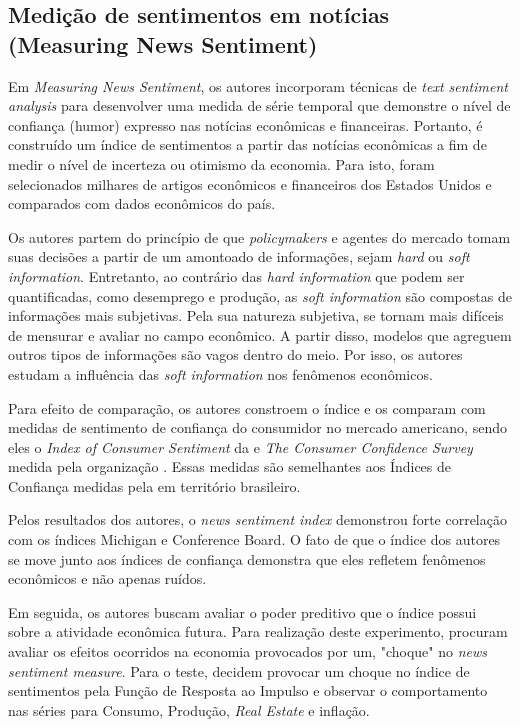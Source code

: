 \subsection{Medição de sentimentos em notícias (Measuring News Sentiment)}

Em \textit{Measuring News Sentiment}, os autores  incorporam técnicas de \textit{text sentiment analysis} para desenvolver uma medida de série temporal que demonstre o nível de confiança (humor) expresso nas notícias econômicas e financeiras. Portanto, é construído um índice de sentimentos a partir das notícias econômicas a fim de medir o nível de incerteza ou otimismo da economia. Para isto, foram selecionados milhares de artigos econômicos e financeiros dos Estados Unidos e comparados com dados econômicos do país.

Os autores partem do princípio de que \textit{policymakers} e agentes do mercado tomam suas decisões a partir de um amontoado de informações, sejam \textit{hard} ou \textit{soft information}. Entretanto, ao contrário das \textit{hard information} que podem ser quantificadas, como desemprego e produção, as \textit{soft information} são compostas de informações mais subjetivas. Pela sua natureza subjetiva, se tornam mais difíceis de mensurar e avaliar no campo econômico. A partir disso, modelos que agreguem outros tipos de informações são vagos dentro do meio. Por isso, os autores estudam a influência das \textit{soft information} nos fenômenos econômicos. 

Para efeito de comparação, os autores constroem o índice e os comparam com medidas de sentimento de confiança do consumidor no mercado americano, sendo eles o \textit{Index of Consumer Sentiment} da  e \textit{The Consumer Confidence Survey} medida pela organização . Essas medidas são semelhantes aos Índices de Confiança medidas pela  em território brasileiro.

Pelos resultados dos autores, o \textit{news sentiment index} demonstrou forte correlação com os índices Michigan e Conference Board. O fato de que o índice dos autores se move junto aos índices de confiança demonstra que eles refletem fenômenos econômicos e não apenas ruídos.

Em seguida, os autores buscam avaliar o poder preditivo que o índice possui sobre a atividade econômica futura. Para realização deste experimento,  procuram avaliar os efeitos ocorridos na economia provocados por um, "choque" no \textit{news sentiment measure}. Para o teste, decidem provocar um choque no índice de sentimentos pela Função de Resposta ao Impulso e observar o comportamento nas séries para Consumo, Produção, \textit{Real Estate} e inflação.

